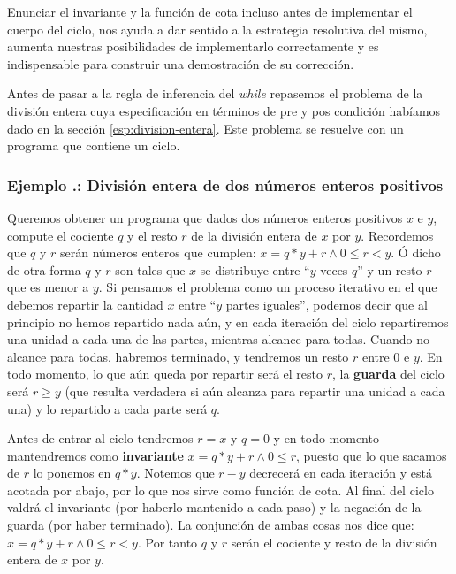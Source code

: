 \documentclass[12pt, a4paper, openany, fleqn]{book}
\newcounter{example}[chapter]
\renewcommand{\theexample}{\thechapter.\arabic{example}}
\newcommand{\example}[1]{
  \refstepcounter{example} %
  \subsubsection*{Ejemplo \theexample: #1}
}
\begin{document}
    Enunciar el invariante y la función de cota incluso antes de implementar el cuerpo del ciclo, nos ayuda a dar sentido a la estrategia resolutiva del mismo, aumenta nuestras posibilidades de implementarlo correctamente y es indispensable para construir una demostración de su corrección.

    Antes de pasar a la regla de inferencia del \textit{while} repasemos el problema de la división entera cuya especificación en términos de pre y pos condición habíamos dado en la sección \ref{esp:division-entera}. Este problema se resuelve con un programa que contiene un ciclo.

    \example{División entera de dos números enteros positivos}

    Queremos obtener un programa que dados dos números enteros positivos $x$ e $y$, compute el cociente $q$ y el resto $r$ de la división entera de $x$ por $y$.
    Recordemos que $q$ y $r$ serán números enteros que cumplen:
    $x = q * y + r \land 0 \leqslant r < y$.
    Ó dicho de otra forma $q$ y $r$ son tales que $x$ se distribuye entre ``$y$ veces $q$'' y un resto $r$ que es menor a $y$.
    Si pensamos el problema como un proceso iterativo en el que debemos repartir la cantidad $x$ entre ``$y$ partes iguales'', podemos decir que al principio no hemos repartido nada aún, y en cada iteración del ciclo repartiremos una unidad a cada una de las partes, mientras alcance para todas. Cuando no alcance para todas, habremos terminado, y tendremos un resto $r$ entre 0 e $y$. En todo momento, lo que aún queda por repartir será el resto $r$, la \textbf{guarda} del ciclo será $r \geqslant y$ (que resulta verdadera si aún alcanza para repartir una unidad a cada una) y lo repartido a cada parte será $q$.

    Antes de entrar al ciclo tendremos $r=x$ y $q=0$ y en todo momento mantendremos como \textbf{invariante} $x = q * y + r \land 0 \leqslant r$, puesto que lo que sacamos de $r$ lo ponemos en $q * y$. Notemos que $r - y$ decrecerá en cada iteración y está acotada por abajo, por lo que nos sirve como función de cota.
    Al final del ciclo valdrá el invariante (por haberlo mantenido a cada paso) y la negación de la guarda (por haber terminado). La conjunción de ambas cosas nos dice que: $x = q * y + r \land 0 \leqslant r < y$. Por tanto $q$ y $r$ serán el cociente y resto de la división entera de $x$ por $y$.
\end{document}
